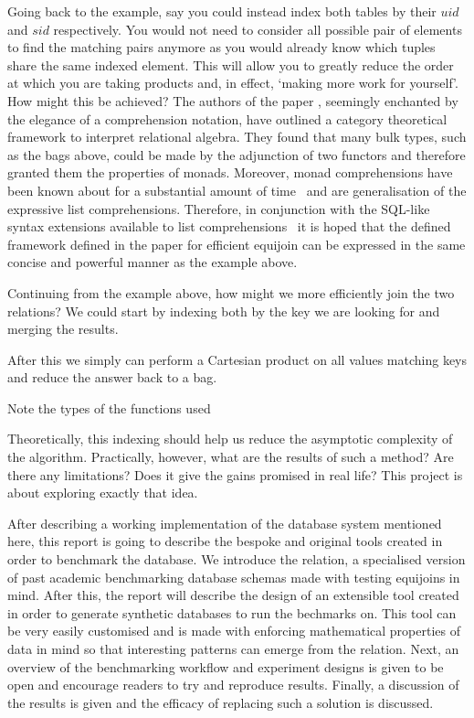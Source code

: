 Going back to the example, say you could instead index both tables by their
$uid$ and $sid$ respectively. You would not need to consider all possible pair
of elements to find the matching pairs anymore as you would already know which
tuples share the same indexed element. This will allow you to greatly reduce the
order at which you are taking products and, in effect, `making more work for
yourself'. How might this be achieved? The authors of the paper \relalg{},
seemingly enchanted by the elegance of a comprehension notation, have outlined a
category theoretical framework to interpret relational algebra. They found that
many bulk types, such as the bags above, could be made by the adjunction of two
functors and therefore granted them the properties of monads. Moreover, monad
comprehensions have been known about for a substantial amount of
time~\cite{MonadComprehensions} and are generalisation of the expressive list
comprehensions. Therefore, in conjunction with the SQL-like syntax extensions
available to list comprehensions~\cite{ComprehensiveComprehensions} it is hoped
that the defined framework defined in the paper for efficient equijoin can be
expressed in the same concise and powerful manner as the example above.

Continuing from the example above, how might we more efficiently join the
two relations? We could start by indexing both by the key we are looking for and
merging the results.


After this we simply can perform a Cartesian product on all values matching keys
and reduce the answer back to a bag.


Note the types of the functions used


Theoretically, this indexing should help us reduce the asymptotic complexity of
the algorithm. Practically, however, what are the results of such a method? Are
there any limitations? Does it give the gains promised  in real life? This
project is about exploring exactly that idea.

After describing a working implementation of the database system mentioned here,
this report is going to describe the bespoke and original tools created in order
to benchmark the database. We introduce the  relation, a
specialised version of past academic benchmarking database schemas made with
testing equijoins in mind. After this, the report will describe the design of
an extensible tool created in order to generate synthetic databases to run the
bechmarks on. This tool can be very easily customised and is made with enforcing
mathematical properties of data in mind so that interesting patterns can emerge
from the  relation. Next, an overview of the benchmarking
workflow and experiment designs is given to be open and encourage readers to try
and reproduce results. Finally, a discussion of the results is given and the
efficacy of replacing such a solution is discussed.

